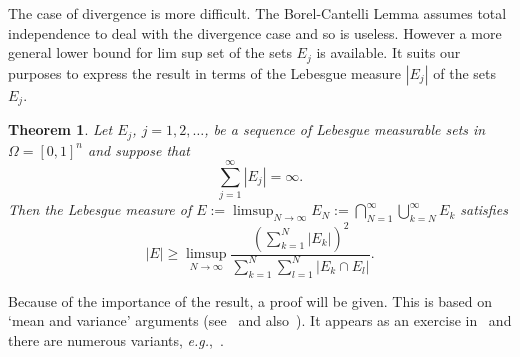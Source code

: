 \documentclass[reqno]{amsart}
\newtheorem{thm}{Theorem}
\renewcommand{\ge}{\geqslant}
\newcommand{\0}{{\mathbf{0}}}
\newcommand{\eg}{{\it{e.g.}}}
\begin{document}
The case of divergence is more difficult.  The Borel-Cantelli Lemma
assumes total independence to deal with the divergence case and so is
useless.  However a more general lower bound for lim sup set of the
sets $E_j$ is available. It suits our purposes to express the result
in terms of the Lebesgue measure $|E_j|$ of the sets $E_j$.
\begin{thm}  
\label{thm:pwi2}
Let $E_j$, $j=1,2,\dots$, be a sequence of Lebesgue measurable sets in
$\Omega=[0,1]^n$  
and suppose that 
 \begin{equation}
\sum_{j=1}^\infty |E_j| =\infty.
   \label{eq:Esum}
 \end{equation}
 Then the Lebesgue measure of $E:=\limsup_{N\to\infty}
 E_N:=\bigcap_{N=1}^\infty \bigcup_{k=N}^\infty E_k$ satisfies
\begin{equation}
 \label{eq:muE}
 |E|  \ge  \limsup_{N\to\infty}\frac{(\sum_{k=1}^N |E_k|)^2}
 {\sum_{k=1}^N\sum_{l=1}^N |E_k\cap E_l|}.
\end{equation}
\end{thm}
Because of the importance of the result, a proof will be given.  This
is based on `mean and variance' arguments (see~\cite{Sullivan82} and
also~\cite{HarmanMNT,Sprindzuk}).  It appears as an exercise
in~\cite{Chung} and there are numerous variants, \eg,~\cite{KS64}.
\end{document}
